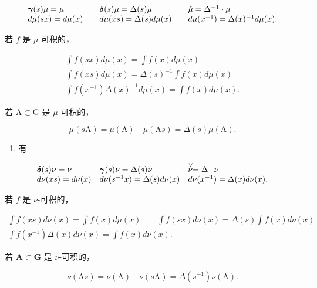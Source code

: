 \[
\begin{array}{l l l l} \boldsymbol {\gamma} (s) \mu = \mu & \quad \boldsymbol {\delta} (s) \mu = \Delta (s) \mu & \quad \check {\mu} = \Delta^ {- 1} \cdot \mu \\ d \mu (s x) = d \mu (x) & \quad d \mu (x s) = \Delta (s)   d \mu (x) & \quad d \mu (x ^ {- 1}) = \Delta (x) ^ {- 1}   d \mu (x). \end{array}
\]

若 \(f\) 是 \(\mu\)-可积的，

\[
\begin{array}{c} \int f (s x) d \mu (x) = \int f (x) d \mu (x) \\ \int f (x s) d \mu (x) = \Delta (s) ^ {- 1} \int f (x) d \mu (x) \\ \int f (x ^ {- 1}) \Delta (x) ^ {- 1} d \mu (x) = \int f (x) d \mu (x). \end{array}
\]

若 \(\mathrm{A}\subset \mathrm{G}\) 是 \(\mu\)-可积的，

\[
\mu (s \mathrm{A}) = \mu (\mathrm{A}) \quad \mu (\mathrm{A} s) = \Delta (s) \mu (\mathrm{A}).
\]

\begin{enumerate}
\def\labelenumi{\arabic{enumi})}
\setcounter{enumi}{1}
\tightlist
\item
  有
\end{enumerate}

\[
\begin{array}{l l l l} \boldsymbol {\delta} (s) \nu = \nu & \boldsymbol {\gamma} (s) \nu = \Delta (s) \nu & \stackrel {{\vee}} {{\nu}} = \Delta \cdot \nu \\ d \nu (x s) = d \nu (x) & d \nu (s ^ {- 1} x) = \Delta (s)   d \nu (x) & d \nu (x ^ {- 1}) = \Delta (x)   d \nu (x). \end{array}
\]

若 \(f\) 是 \(\nu\)-可积的，

\[
\begin{array}{c} \int f (x s) d \nu (x) = \int f (x) d \mu (x) \qquad \int f (s x) d \nu (x) = \Delta (s) \int f (x) d \nu (x) \\ \int f (x ^ {- 1}) \Delta (x) d \nu (x) = \int f (x) d \nu (x). \end{array}
\]

若 \(\mathbf{A}\subset \mathbf{G}\) 是 \(\nu\)-可积的，

\[
\nu (\mathrm{A} s) = \nu (\mathrm{A}) \quad \nu (s \mathrm{A}) = \Delta (s ^ {- 1}) \nu (\mathrm{A}).
\]

